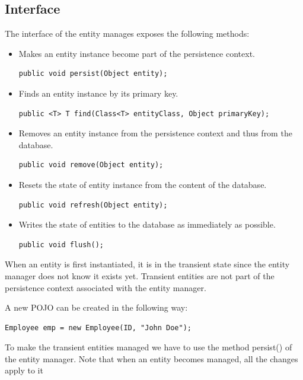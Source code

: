 \documentclass[12pt, a4paper]{report}
\begin{document}
    \subsection{Interface}
    The interface of the entity manages exposes the following methods: 
    \begin{itemize}
        \item Makes an entity instance become part of the persistence context. 
            \begin{lstlisting}[style=Java]
public void persist(Object entity); 
            \end{lstlisting}
        \item Finds an entity instance by its primary key. 
            \begin{lstlisting}[style=Java]
public <T> T find(Class<T> entityClass, Object primaryKey);
            \end{lstlisting}
        \item Removes an entity instance from the persistence context and thus from the database.
            \begin{lstlisting}[style=Java]
public void remove(Object entity); 
            \end{lstlisting}
        \item Resets the state of entity instance from the content of the database.
            \begin{lstlisting}[style=Java]
public void refresh(Object entity); 
            \end{lstlisting}
        \item Writes the state of entities to the database as immediately as possible.
            \begin{lstlisting}[style=Java]
public void flush();
            \end{lstlisting}
    \end{itemize}
    When an entity is first instantiated, it is in the transient state since the entity manager does not know it exists yet. Transient entities are not part of the 
    persistence context associated with the entity manager. 
    \begin{example}
        A new POJO can be created in the following way: 
        \begin{lstlisting}[style=Java]
Employee emp = new Employee(ID, "John Doe"); 
        \end{lstlisting}
    \end{example}
    To make the transient entities managed we have to use the method persist() of the entity manager. Note that when an entity becomes managed, all the changes apply to it 
\end{document}
